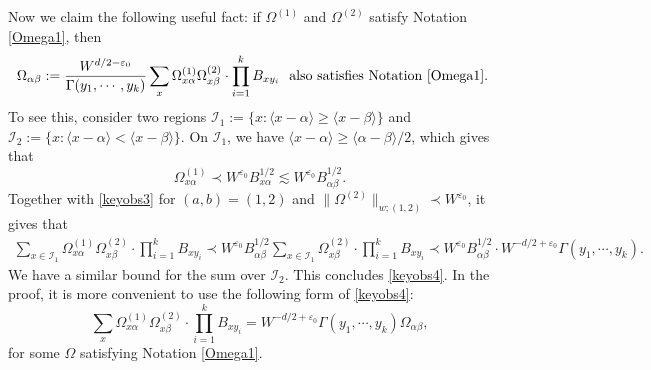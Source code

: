 \documentclass{article}
\newcommand{\1}{\mathds{1}}
\numberwithin{equation}{section}
\newcommand{\al}{\alpha}
\newcommand{\be}{\begin{equation}}
\newcommand{\ee}{\end{equation}}
\newcommand{\e}{{\varepsilon}}
\renewcommand{\cal}{\mathcal}
\renewcommand{\geq}{\geqslant}
\renewcommand{\ge}{\geq}
\theoremstyle{plain} %
\theoremstyle{remark}
\begin{document}
Now we claim the following useful fact: if $\Omega^{(1)}$ and $\Omega^{(2)}$ satisfy Notation \ref{Omega1}, then
\be\label{keyobs4}
\begin{split}
& \Omega_{\al\beta}:=\frac{W^{d/2-\e_0}}{\Gamma(y_1,\cdots, y_k)}\sum_{x}  \Omega^{(1)}_{x  \al}\Omega ^{(2)}_{x  \beta}\cdot  \prod_{i=1}^k B_{x y_i} \ \ \text{also satisfies Notation \ref{Omega1}.}
\end{split}
\ee
To see this, consider two regions $\cal I_1:=\{x : \langle x -\al\rangle \ge \langle x -\beta\rangle \}$ and  $\cal I_2:=\{x : \langle x - \al\rangle < \langle x -\beta\rangle  \}$. On $\cal I_1$, we have $\langle x -\al\rangle \ge \langle \al -\beta\rangle/2$, which gives that
$$\Omega^{(1)} _{x \al}   \prec W^{\e_0}B_{x \al}^{1/2} \lesssim W^{\e_0}B_{\al \beta}^{1/2}.$$
Together with \eqref{keyobs3} for $(a,b)=(1,2)$ and $\|\Omega^{(2)}\|_{w;(1,2)}\prec W^{\e_0}$, it gives that
\begin{align*}
\sum_{x \in \cal I_1}  \Omega^{(1)}_{x \al}\Omega^{(2)} _{x \beta} \cdot  \prod_{i=1}^k B_{x y_i}   \prec W^{\e_0}B_{\al \beta}^{1/2}\sum_{x \in \cal I_1} \Omega^{(2)} _{x \beta} \cdot  \prod_{i=1}^k B_{x y_i}  \prec W^{\e_0}B_{\al \beta}^{1/2} \cdot W^{- d/2+\e_0}\Gamma(y_1,\cdots, y_k) .
\end{align*}
We have a similar bound for the sum over $\cal I_2$. This concludes \eqref{keyobs4}. In the proof, it is more convenient to use the  following form of \eqref{keyobs4}:
\be\label{keyobs5}
\sum_{x} \Omega^{(1)}_{x \al}\Omega^{(2)} _{x \beta}\cdot  \prod_{i=1}^k B_{x y_i}  = W^{- d/2+\e_0}\Gamma(y_1,\cdots, y_k)  \Omega_{\al\beta},
\ee
for some $\Omega$ satisfying Notation \ref{Omega1}.
\end{document}

